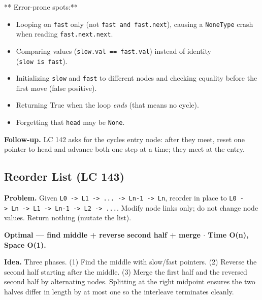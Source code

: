 \documentclass[11pt]{article}
\providecommand{\tightlist}{\setlength{\itemsep}{1pt}\setlength{\parskip}{0pt}}
\begin{document}
** Error-prone spots:**

\begin{itemize}
\tightlist
\item
  Looping on \texttt{fast} only (not \texttt{fast\ and\ fast.next}), causing a \texttt{NoneType} crash when reading \texttt{fast.next.next}.
\item
  Comparing values (\texttt{slow.val\ ==\ fast.val}) instead of identity (\texttt{slow\ is\ fast}).
\item
  Initializing \texttt{slow} and \texttt{fast} to different nodes and checking equality before the first move (false positive).
\item
  Returning True when the loop \emph{ends} (that means no cycle).
\item
  Forgetting that \texttt{head} may be \texttt{None}.
\end{itemize}

\textbf{Follow-up.} LC 142 asks for the cycle\textquotesingle s entry node: after they meet, reset one pointer to head and advance both one step at a time; they meet at the entry.

\subsection{Reorder List (LC 143)}\label{reorder-list-lc-143}

\textbf{Problem.} Given \texttt{L0\ -\textgreater{}\ L1\ -\textgreater{}\ ...\ -\textgreater{}\ Ln-1\ -\textgreater{}\ Ln}, reorder in place to \texttt{L0\ -\textgreater{}\ Ln\ -\textgreater{}\ L1\ -\textgreater{}\ Ln-1\ -\textgreater{}\ L2\ -\textgreater{}\ ...}. Modify node links only; do not change node values. Return nothing (mutate the list).

\textbf{Optimal --- find middle + reverse second half + merge \(\cdot\) Time O(n), Space O(1).}

\textbf{Idea.} Three phases. (1) Find the middle with slow/fast pointers. (2) Reverse the second half starting after the middle. (3) Merge the first half and the reversed second half by alternating nodes. Splitting at the right midpoint ensures the two halves differ in length by at most one so the interleave terminates cleanly.

\end{document}
